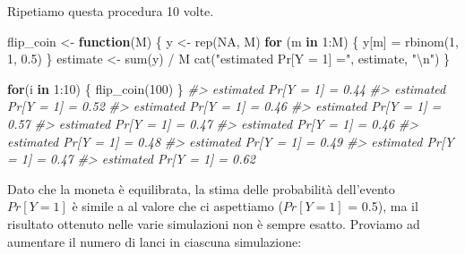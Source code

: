 \documentclass[
  11pt,
]{krantz}
\makeatletter
\newenvironment{Shaded}{\begin{snugshade}}{\end{snugshade}}
\newcommand{\CommentTok}[1]{\textcolor[rgb]{0.37,0.37,0.37}{\textit{#1}}}
\newcommand{\ConstantTok}[1]{\textcolor[rgb]{0,0,0}{#1}}
\newcommand{\ControlFlowTok}[1]{\textcolor[rgb]{0.27,0.27,0.27}{\textbf{#1}}}
\newcommand{\DecValTok}[1]{\textcolor[rgb]{0.06,0.06,0.06}{#1}}
\newcommand{\FloatTok}[1]{\textcolor[rgb]{0.06,0.06,0.06}{#1}}
\newcommand{\FunctionTok}[1]{\textcolor[rgb]{0,0,0}{#1}}
\newcommand{\NormalTok}[1]{#1}
\newcommand{\OtherTok}[1]{\textcolor[rgb]{0.37,0.37,0.37}{#1}}
\newcommand{\SpecialCharTok}[1]{\textcolor[rgb]{0,0,0}{#1}}
\newcommand{\StringTok}[1]{\textcolor[rgb]{0.5,0.5,0.5}{#1}}
\newenvironment{kframe}{%
\medskip{}
\setlength{\fboxsep}{.8em}
 \def\at@end@of@kframe{}%
 \ifinner\ifhmode%
  \def\at@end@of@kframe{\end{minipage}}%
  \begin{minipage}{\columnwidth}%
 \fi\fi%
 \def\FrameCommand##1{\hskip\@totalleftmargin \hskip-\fboxsep
 \colorbox{shadecolor}{##1}\hskip-\fboxsep
     \hskip-\linewidth \hskip-\@totalleftmargin \hskip\columnwidth}%
 \MakeFramed {\advance\hsize-\width
   \@totalleftmargin\z@ \linewidth\hsize
   \@setminipage}}%
 {\par\unskip\endMakeFramed%
 \at@end@of@kframe}
\renewenvironment{Shaded}{\begin{kframe}}{\end{kframe}}
\theoremstyle{definition}
\theoremstyle{definition}
\theoremstyle{definition}
\theoremstyle{definition}
\theoremstyle{remark}
\makeatother
\begin{document}
Ripetiamo questa procedura 10 volte.

\begin{Shaded}
\begin{Highlighting}[]
\NormalTok{flip\_coin }\OtherTok{\textless{}{-}} \ControlFlowTok{function}\NormalTok{(M) \{}
\NormalTok{  y }\OtherTok{\textless{}{-}} \FunctionTok{rep}\NormalTok{(}\ConstantTok{NA}\NormalTok{, M)}
  \ControlFlowTok{for}\NormalTok{ (m }\ControlFlowTok{in} \DecValTok{1}\SpecialCharTok{:}\NormalTok{M) \{}
\NormalTok{    y[m] }\OtherTok{=} \FunctionTok{rbinom}\NormalTok{(}\DecValTok{1}\NormalTok{, }\DecValTok{1}\NormalTok{, }\FloatTok{0.5}\NormalTok{)}
\NormalTok{  \}}
\NormalTok{  estimate }\OtherTok{\textless{}{-}} \FunctionTok{sum}\NormalTok{(y) }\SpecialCharTok{/}\NormalTok{ M}
  \FunctionTok{cat}\NormalTok{(}\StringTok{"estimated Pr[Y = 1] ="}\NormalTok{, estimate, }\StringTok{"}\SpecialCharTok{\textbackslash{}n}\StringTok{"}\NormalTok{)}
\NormalTok{\}}
\end{Highlighting}
\end{Shaded}

\begin{Shaded}
\begin{Highlighting}[]
\ControlFlowTok{for}\NormalTok{(i }\ControlFlowTok{in} \DecValTok{1}\SpecialCharTok{:}\DecValTok{10}\NormalTok{) \{}
  \FunctionTok{flip\_coin}\NormalTok{(}\DecValTok{100}\NormalTok{)}
\NormalTok{\}}
\CommentTok{\#\textgreater{} estimated Pr[Y = 1] = 0.44 }
\CommentTok{\#\textgreater{} estimated Pr[Y = 1] = 0.52 }
\CommentTok{\#\textgreater{} estimated Pr[Y = 1] = 0.46 }
\CommentTok{\#\textgreater{} estimated Pr[Y = 1] = 0.57 }
\CommentTok{\#\textgreater{} estimated Pr[Y = 1] = 0.47 }
\CommentTok{\#\textgreater{} estimated Pr[Y = 1] = 0.46 }
\CommentTok{\#\textgreater{} estimated Pr[Y = 1] = 0.48 }
\CommentTok{\#\textgreater{} estimated Pr[Y = 1] = 0.49 }
\CommentTok{\#\textgreater{} estimated Pr[Y = 1] = 0.47 }
\CommentTok{\#\textgreater{} estimated Pr[Y = 1] = 0.62}
\end{Highlighting}
\end{Shaded}

Dato che la moneta è equilibrata, la stima delle probabilità dell'evento \(Pr[Y = 1]\) è simile a al valore che ci aspettiamo (\(Pr[Y = 1]\) = 0.5), ma il risultato ottenuto nelle varie simulazioni non è sempre esatto. Proviamo ad aumentare il numero di lanci in ciascuna simulazione:
\end{document}
